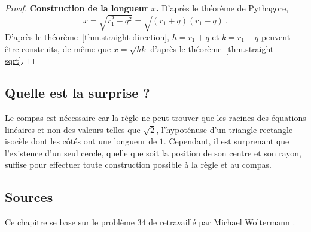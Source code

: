 \begin{proof}
\medskip

\noindent\textbf{Construction de la longueur $x$.} D'après le théorème de Pythagore,
\[
x=\sqrt{r_1^2-q^2}=\sqrt{(r_1+q)(r_1-q)}\,.
\]
D'après le théorème~\ref{thm.straight-direction}, $h =r_1+ q$ et $k= r_1 - q$ peuvent être construits, de même que $x=\sqrt{hk}$ d'après le théorème~\ref{thm.straight-sqrt}.
\end{proof}



\subsection*{Quelle est la surprise ?}

Le compas est nécessaire car la règle ne peut trouver que les racines des équations linéaires et non des valeurs telles que $\sqrt{2}$, l'hypoténuse d'un triangle rectangle isocèle dont les côtés ont une longueur de $1$. Cependant, il est surprenant que l'existence d'un seul cercle, quelle que soit la position de son centre et  son rayon, suffise pour effectuer toute construction possible à la  règle et au compas.



\subsection*{Sources}

Ce chapitre se base sur le problème $34$ de \cite{dorrie1} retravaillé par Michael Woltermann \cite{dorrie2}.
